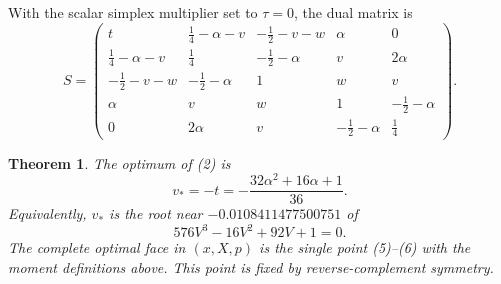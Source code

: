 \documentclass[11pt]{article}
\newtheorem{theorem}{Theorem}
\begin{document}
With the scalar simplex multiplier set to $\tau=0$, the dual matrix is
\begin{equation}
S=\begin{pmatrix}
t&\frac14-\alpha-v&-\frac12-v-w&\alpha&0\\
\frac14-\alpha-v&\frac14&-\frac12-\alpha&v&2\alpha\\
-\frac12-v-w&-\frac12-\alpha&1&w&v\\
\alpha&v&w&1&-\frac12-\alpha\\
0&2\alpha&v&-\frac12-\alpha&\frac14
\end{pmatrix}.                                                    \tag{7}
\end{equation}

\begin{theorem}\label{thm:main}
The optimum of \emph{(2)} is
\[
v_*=-t=-\frac{32\alpha^2+16\alpha+1}{36}.
\]
Equivalently, $v_*$ is the root near $-0.0108411477500751$ of
\begin{equation}
576V^3-16V^2+92V+1=0.                                             \tag{8}
\end{equation}
The complete optimal face in $(x,X,p)$ is the single point
\emph{(5)}--\emph{(6)} with the moment definitions above.  This point is
fixed by reverse-complement symmetry.
\end{theorem}
\end{document}
